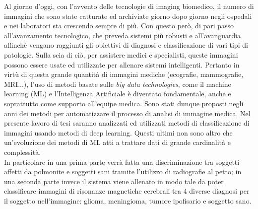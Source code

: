 Al giorno d’oggi, con l’avvento delle tecnologie di imaging biomedico,
 il numero di immagini che sono state catturate ed archiviate giorno dopo giorno negli ospedali 
 e nei laboratori sta crescendo sempre di più. Con questo però, di pari passo all'avanzamento tecnologico, che preveda sistemi  
  più robusti e all’avanguardia affinchè vengano raggiunti gli obiettivi di diagnosi e classificazione di 
  vari tipi di patologie. 
Sulla scia di ciò, per assistere medici e specialisti, queste immagini possono essere usate 
ed utilizzate per allenare sistemi intelligenti. Pertanto in virtù di questa grande quantità di 
immagini mediche (ecografie, mammografie, MRI...), l’uso di metodi basate sulle \emph{big data technologies}, 
come il machine learning (ML) e l’Intelligenza Artificiale è diventato fondamentale, 
anche e soprattutto come supporto all’equipe medica. 
Sono stati dunque proposti negli anni dei metodi per automatizzare il processo di analisi
 di immagine medica. 
Nel presente lavoro di tesi saranno analizzati ed utilizzati metodi di classificazione di 
immagini usando metodi di deep learning. Questi ultimi non sono altro che un’evoluzione dei metodi di ML 
atti a trattare dati di grande cardinalità e complessità. \\
In particolare  in una prima parte verrà
 fatta una discriminazione tra soggetti affetti da polmonite e soggetti sani tramite l’utilizzo
  di radiografie al petto; in una seconda parte invece il sistema viene allenato in modo tale da 
  poter classificare immagini di risonanze magnetiche cerebrali tra 4 diverse diagnosi per 
  il soggetto nell’immagine: glioma, meningioma, tumore ipofisario e soggetto sano.

